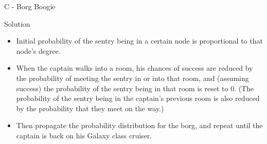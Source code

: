 \renewcommand{\insertshortauthor}{Jon Marius Venstad}
\begin{frame}{C - Borg Boogie}

\begin{block}{Solution}
  \begin{itemize}
	\item Initial probability of the sentry being in a certain node 
is proportional to that node's degree.
	\item When the captain walks into a room, his chances of success 
are reduced by the probability of meeting the sentry in or into that room,
 and (assuming success) the probability of the sentry being in that room 
is reset to $0$. (The probability of the sentry being in the captain's
 previous room is also reduced by the probability that they meet on the 
way.) 
	\item Then propagate the probability distribution for the borg, 
and repeat until the captain is back on his Galaxy class cruiser. 
  \end{itemize}
\end{block}

\end{frame}
